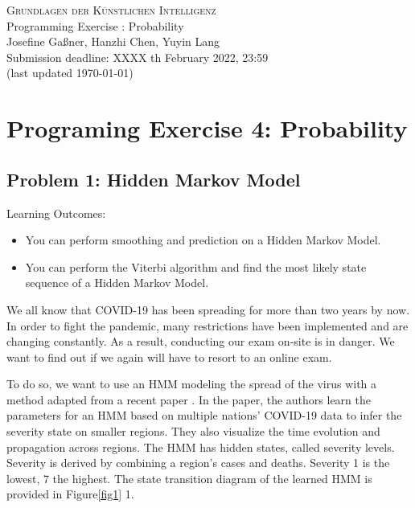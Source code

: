 \documentclass[a4paper,10pt]{article}
\newcounter{exercisecounter}
\begin{document}
    \Large\noindent\textsc{Grundlagen der K\"{u}nstlichen Intelligenz}\\
    \large\noindent Programming Exercise : Probability \\
    Josefine Gaßner, Hanzhi Chen, Yuyin Lang\\
    
    Submission deadline: XXXX th February 2022, 23:59\\
    {\small(last updated \today)}\\
    \vspace{0.2cm}
    
    
    
    
    \section*{Programing Exercise 4: Probability}
    
    \subsection*{Problem 1: Hidden Markov Model}
    Learning Outcomes:
    
    \begin{itemize} 
        \item You can perform smoothing and prediction on a Hidden Markov Model.
        \item You can perform the Viterbi algorithm and find the most likely state sequence of a Hidden Markov Model.
    \end{itemize}
    
   We all know that COVID-19 has been spreading for more than two years by now. In order to fight the pandemic,
   many restrictions have been implemented and are changing constantly. As a result, conducting our exam on-site is
   in danger. We want to find out if we again will have to resort to an online exam.
   
   To do so, we want to use an HMM modeling the spread of the virus with a method adapted from a recent paper \cite{HMMPaper}. In the paper, the authors learn the parameters for an HMM based on multiple nations’ COVID-19 data to infer the severity state on smaller regions. They also visualize the
   time evolution and propagation across regions. The HMM has hidden states, called
   severity levels. Severity is derived by combining a region's cases and deaths. Severity 1 is the lowest, 7 the highest. The state transition diagram of the learned HMM is provided in Figure\ref{fig1} 1.
   
\end{document}
